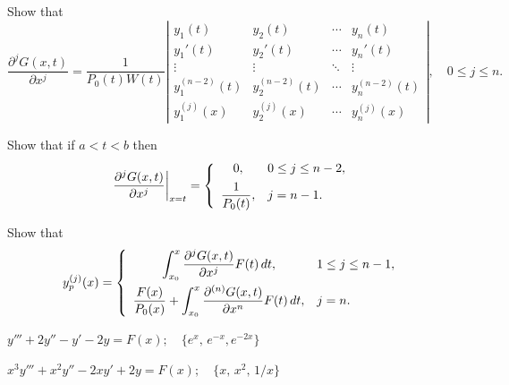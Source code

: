 \begin{exerciselist}
\begin{alist}
    \item %
    Show that
    \[
      \frac{\partial^{j}G(x,t)}{\partial x^{j}}=\frac{1}{P_{0}(t)W(t)}\left|
      \begin{array}{cccc}
        y_{1}(t)         & y_{2}(t)         & \cdots & y_{n}(t)         \\[5pt]
        y_{1}'(t)        & y_{2}'(t)        & \cdots & y_{n}'(t)        \\[5pt]
        \vdots           & \vdots           & \ddots & \vdots           \\[5pt]
        y_{1}^{(n-2)}(t) & y_{2}^{(n-2)}(t) & \cdots & y_{n}^{(n-2)}(t) \\[5pt]
        y_{1}^{(j)}(x)   & y_{2}^{(j)}(x)   & \cdots & y_{n}^{(j)}(x)
      \end{array}\right|,\quad0\le j\le n.
    \]

    \item %
    Show that if $a<t<b$ then
    \[
      \left.\frac{\partial^{j}G(x,t)}{\partial x^{j}}\right|_{x=t}= \left\{
      \begin{array}{cl}
        0,                      & 0\le j\le n-2, \\[5pt]
        \displaystyle\frac{1}{P_{0}(t)}, & j=n-1.
      \end{array}\right.
    \]

    \item %
    Show that
    \[
      y_{p}^{(j)}(x)=\left\{
      \begin{array}{cl}
        \displaystyle{\int_{x_{0}}^{x} \frac{\partial^{j}G(x,t)}{\partial x^{j}}F(t)\,dt},                         & 1\le j\le n-1, \\[10pt]
        \displaystyle{\frac{F(x)}{P_{0}(x)}+ \int_{x_{0}}^{x}\frac{\partial^{(n)}G(x,t)}{\partial x^{n}}F(t)\,dt}, & j=n.
      \end{array}\right.
    \]
  \end{alist}


  \item\label{exer:9.4.35} $y'''+2y''-y'-2y=F(x);\quad\{e^{x},\,e^{-x},e^{-2x}\}$

  \item\label{exer:9.4.36} $x^{3}y'''+x^{2}y''-2xy'+2y=F(x);\quad\{x,\,x^{2},\,1/x\}$


\end{exerciselist}
